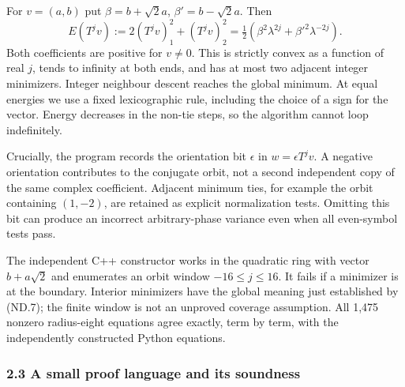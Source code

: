 For \(v=(a,b)\) put \(\beta=b+\sqrt2 a\), \(\beta'=b-\sqrt2 a\). Then \[
 E(T^jv):=2(T^jv)_1^2+(T^jv)_2^2
       =\tfrac12(\beta^2\lambda^{2j}+\beta'^2\lambda^{-2j}). \tag{ND.7}
\] Both coefficients are positive for \(v\ne0\). This is strictly convex as a function of real \(j\), tends to infinity at both ends, and has at most two adjacent integer minimizers. Integer neighbour descent reaches the global minimum. At equal energies we use a fixed lexicographic rule, including the choice of a sign for the vector. Energy decreases in the non-tie steps, so the algorithm cannot loop indefinitely.

Crucially, the program records the orientation bit \(\epsilon\) in \(w=\epsilon T^jv\). A negative orientation contributes to the conjugate orbit, not a second independent copy of the same complex coefficient. Adjacent minimum ties, for example the orbit containing \((1,-2)\), are retained as explicit normalization tests. Omitting this bit can produce an incorrect arbitrary-phase variance even when all even-symbol tests pass.

The independent C++ constructor works in the quadratic ring with vector \(b+a\sqrt2\) and enumerates an orbit window \(-16\leq j\leq16\). It fails if a minimizer is at the boundary. Interior minimizers have the global meaning just established by (ND.7); the finite window is not an unproved coverage assumption. All 1,475 nonzero radius-eight equations agree exactly, term by term, with the independently constructed Python equations.

\subsubsection{2.3 A small proof language and its soundness}\label{nondegeneracy:a-small-proof-language-and-its-soundness}

